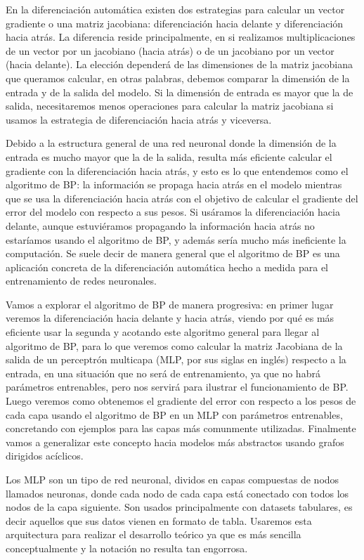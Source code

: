En la diferenciación automática existen dos estrategias para calcular un vector gradiente o una matriz jacobiana: diferenciación hacia delante y diferenciación hacia atrás. La diferencia reside  principalmente, en si realizamos multiplicaciones de un vector por un jacobiano (hacia atrás) o de un jacobiano por un vector (hacia delante). La elección dependerá de las dimensiones de la matriz jacobiana que queramos calcular, en otras palabras, debemos comparar la dimensión de la entrada y de la salida del modelo. Si la dimensión de entrada es mayor que la de salida, necesitaremos menos operaciones para calcular la matriz jacobiana si usamos la estrategia de diferenciación hacia atrás y viceversa. 

Debido a la estructura general de una red neuronal donde la dimensión de la entrada es mucho mayor que la de la salida, resulta más eficiente calcular el gradiente con la diferenciación hacia atrás, y esto es lo que entendemos como el algoritmo de BP: la información se propaga hacia atrás en el modelo mientras que se usa la diferenciación hacia atrás con el objetivo de calcular el gradiente del error del modelo con respecto a sus pesos. Si usáramos la diferenciación hacia delante, aunque estuviéramos propagando la información hacia atrás no estaríamos usando el algoritmo de BP, y además sería mucho más ineficiente la computación. Se suele decir de manera general que el algoritmo de BP es una aplicación concreta de la diferenciación automática hecho a medida para el entrenamiento de redes neuronales.


Vamos a explorar el algoritmo de BP de manera progresiva: en primer lugar veremos la diferenciación hacia delante y hacia atrás, viendo por qué es más eficiente usar la segunda y acotando este algoritmo general para llegar al algoritmo de BP, para lo que veremos como calcular la matriz Jacobiana de la salida de un perceptrón multicapa (MLP, por sus siglas en inglés) respecto a la entrada, en una situación que no será de entrenamiento, ya que no habrá parámetros entrenables, pero nos servirá para ilustrar el funcionamiento de BP. Luego veremos como obtenemos el gradiente del error con respecto a los pesos de cada capa usando el algoritmo de BP en un MLP con parámetros entrenables, concretando con ejemplos para las capas más comunmente utilizadas. Finalmente vamos a generalizar este concepto hacia modelos más abstractos usando grafos dirigidos acíclicos. 


Los MLP son un tipo de red neuronal, dividos en capas compuestas de nodos llamados neuronas, donde cada nodo de cada capa está conectado con todos los nodos de la capa siguiente. Son usados principalmente con datasets tabulares, es decir aquellos que sus datos vienen en formato de tabla. Usaremos esta arquitectura para realizar el desarrollo teórico ya que es más sencilla conceptualmente y la notación no resulta tan engorrosa. 


